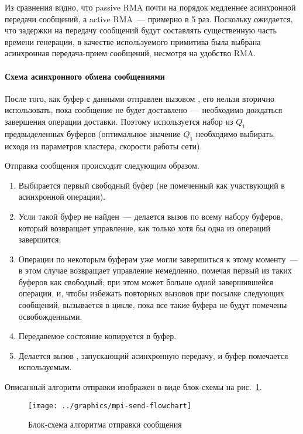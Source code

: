 Из сравнения видно, что passive RMA почти на порядок медленнее асинхронной передачи
сообщений, а active RMA~--- примерно в 5 раз. Поскольку ожидается, что задержки на
передачу сообщений будут составлять существенную часть времени генерации, в качестве
используемого примитива была выбрана асинхронная передача-прием сообщений, несмотря на
удобство RMA.

\paragraph{Схема асинхронного обмена сообщениями}
\label{sec:async-mpi-queue}

После того, как буфер с данными отправлен вызовом , его нельзя вторично
использовать, пока сообщение не будет доставлено~--- необходимо дождаться завершения
операции доставки. Поэтому используется набор из $Q_1$ предвыделенных буферов (оптимальное
значение $Q_1$ необходимо выбирать, исходя из параметров кластера, скорости работы
сети\etc).

Отправка сообщения происходит следующим образом.
\begin{enumerate}
\item Выбирается первый свободный буфер (не помеченный как участвующий в асинхронной
  операции).
\item Усли такой буфер не найден~--- делается вызов  по всему набору
  буферов, который возвращает управление, как только хотя бы одна из операций завершится;
\item Операции по некоторым буферам уже могли завершиться к этому моменту~--- в этом
  случае  возвращает управление немедленно, помечая первый из таких буферов
  как свободный; при этом может больше одной завершившейся операции, и, чтобы избежать
  повторных вызовов  при посылке следующих сообщений, 
  вызывается в цикле, пока все такие буфера не будут помечены освобожденными.
\item Передавемое состояние копируется в буфер.
\item Делается вызов , запускающий асинхронную передачу, и буфер помечается
  используемым.
\end{enumerate}

Описанный алгоритм отправки изображен в виде блок-схемы на
рис.~\ref{fig:mpi-send-flowchart}.

\begin{figure}[!tb]
  \centering
  \texttt{[image: ../graphics/mpi-send-flowchart]}
  \caption{Блок-схема алгоритма отправки сообщения}
  \label{fig:mpi-send-flowchart}
\end{figure}

